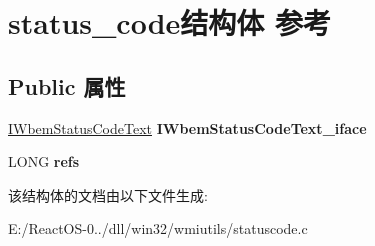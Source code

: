 \hypertarget{structstatus__code}{}\section{status\+\_\+code结构体 参考}
\label{structstatus__code}
\subsection*{Public 属性}
\begin{DoxyCompactItemize}
\item 
\mbox{\label{structstatus__code_aeca8b3e621ac4ef5244d8432fa91ffa4}} 
\hyperlink{interface_i_wbem_status_code_text}{I\+Wbem\+Status\+Code\+Text} {\bfseries I\+Wbem\+Status\+Code\+Text\+\_\+iface}
\item 
\mbox{\label{structstatus__code_aa1e8d04fdeb431cc519b9af7c48fc167}} 
L\+O\+NG {\bfseries refs}
\end{DoxyCompactItemize}


该结构体的文档由以下文件生成\+:\begin{DoxyCompactItemize}
\item 
E\+:/\+React\+O\+S-\/0../dll/win32/wmiutils/statuscode.\+c\end{DoxyCompactItemize}
